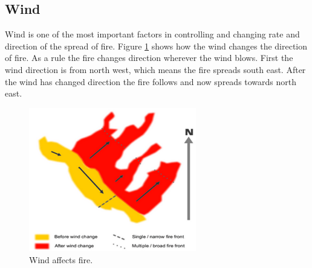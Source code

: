 \subsection{Wind}
Wind is one of the most important factors in controlling and changing rate and direction of the spread of fire. Figure \ref{fig:fire-wind} shows how the wind changes the direction of fire. As a rule the fire changes direction wherever the wind blows. First the wind direction is from north west, which means the fire spreads south east. After the wind has changed direction the fire follows and now spreads towards north east.
\begin{figure}[here]
  \centering
      \includegraphics[width=0.65\textwidth]{theory/graphics/fire-wind.png}
  \caption{Wind affects fire. \cite{fireweather} }
  \label{fig:fire-wind}
\end{figure}
